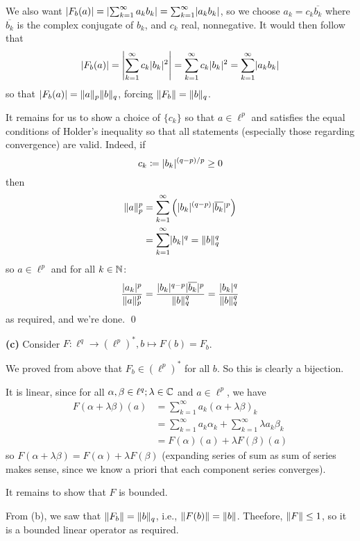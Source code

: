 \documentclass[a4paper, 10pt]{article}
\begin{document}
\begin{solution}
    We also want $\abs{F_b(a)} = \abs{\sum_{k=1}^{\infty} a_k b_k} = \sum_{k=1}^{\infty} \abs{a_k b_k}$, so we choose $a_k = c_k \overline{b_k}$ where $\overline{b_k}$ is the complex conjugate of $b_k$, and $c_k$ real, nonnegative. It would then follow that 
\begin{equation*}
    \abs{F_b(a)} = \abs*{\sum_{k=1}^{\infty} c_k \abs{b_k}^2} = \sum_{k=1}^{\infty} c_k \abs{b_k}^2 = \sum_{k=1}^{\infty} \abs{a_k b_k}
\end{equation*}
so that $\abs{F_b(a)} = \norm{a}_p \norm{b}_q$, forcing $\norm{F_b} = \norm{b}_q$.

It remains for us to show a choice of $\{c_k\}$ so that $a \in \ell^p$ and satisfies the equal conditions of Holder's inequality so that all statements (especially those regarding convergence) are valid. Indeed, if \begin{equation*}
c_k \coloneqq \abs{b_k}^{(q-p)/p} \geq 0
\end{equation*}
then \begin{align*}
\norm{a}_p^p &= \sum_{k=1}^{\infty} \left(\abs{b_k}^{(q-p)} \abs{\overline{b_k}}^p\right) \\
&= \sum_{k=1}^{\infty} \abs{b_k}^q = \norm{b}_q^q
\end{align*}
so $a \in \ell^p$ and for all $k \in \bbn$:\begin{equation*}
    \frac{\abs{a_k}^p}{\norm{a}_p^p} = \frac{\abs{b_k}^{q-p} \abs{\overline{b_k}}^p}{\norm{b}_q^q} = \frac{\abs{b_k}^q}{\norm{b}_q^q}
\end{equation*}
as required, and we're done. \qed


    \textbf{(c)} Consider $F: \ell^q \to (\ell^p)^*, b \mapsto F(b) = F_b$.

    We proved from above that $F_b \in (\ell^p)^*$ for all $b$. So this is clearly a bijection.

    It is linear, since for all $\alpha, \beta \in \ell^q; \lambda \in \bbc$ and $a \in \ell^p$, we have
    \begin{align*}
    F (\alpha + \lambda \beta) (a) &= \sum_{k=1}^{\infty} a_k (\alpha + \lambda \beta)_k \\
    &= \sum_{k=1}^{\infty} a_k \alpha_k + \sum_{k=1}^{\infty} \lambda a_k \beta_k \\
    &= F(\alpha)(a) + \lambda F(\beta)(a)
    \end{align*}
    so $F(\alpha + \lambda \beta) = F(\alpha) + \lambda F(\beta)$ (expanding series of sum as sum of series makes sense, since we know a priori that each component series converges).

    It remains to show that $F$ is bounded.

    From (b), we saw that $\norm{F_b} = \norm{b}_q$, i.e., $\norm{F(b)} = \norm{b}$. Theefore, $\norm{F} \leq 1$, so it is a bounded linear operator as required.
\end{solution}
\end{document}
